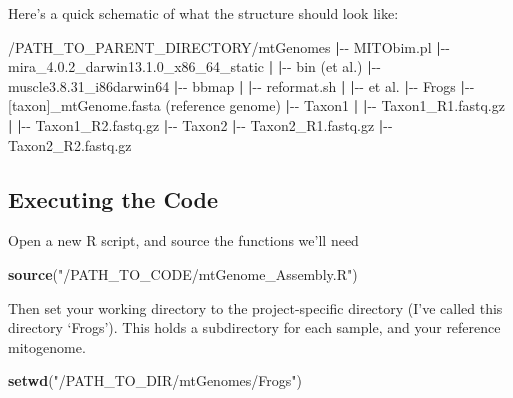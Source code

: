 \documentclass[
]{article}
\newenvironment{Shaded}{\begin{snugshade}}{\end{snugshade}}
\newcommand{\ExtensionTok}[1]{#1}
\newcommand{\KeywordTok}[1]{\textcolor[rgb]{0.13,0.29,0.53}{\textbf{#1}}}
\newcommand{\NormalTok}[1]{#1}
\newcommand{\StringTok}[1]{\textcolor[rgb]{0.31,0.60,0.02}{#1}}
\begin{document}
Here's a quick schematic of what the structure should look like:

\begin{Shaded}
\begin{Highlighting}[]
\ExtensionTok{/PATH\_TO\_PARENT\_DIRECTORY/mtGenomes}
\KeywordTok{|}\ExtensionTok{{-}{-}}\NormalTok{ MITObim.pl}
\KeywordTok{|}\ExtensionTok{{-}{-}}\NormalTok{ mira\_4.0.2\_darwin13.1.0\_x86\_64\_static}
\KeywordTok{|}   \KeywordTok{|}\ExtensionTok{{-}{-}}\NormalTok{ bin (et al.)}
\KeywordTok{|}\ExtensionTok{{-}{-}}\NormalTok{ muscle3.8.31\_i86darwin64}
\KeywordTok{|}\ExtensionTok{{-}{-}}\NormalTok{ bbmap}
\KeywordTok{|}   \KeywordTok{|}\ExtensionTok{{-}{-}}\NormalTok{ reformat.sh}
\KeywordTok{|}   \KeywordTok{|}\ExtensionTok{{-}{-}}\NormalTok{ et al.}
\KeywordTok{|}\ExtensionTok{{-}{-}}\NormalTok{ Frogs}
    \KeywordTok{|}\ExtensionTok{{-}{-}}\NormalTok{ [taxon]\_mtGenome.fasta (reference genome)}
    \KeywordTok{|}\ExtensionTok{{-}{-}}\NormalTok{ Taxon1}
    \KeywordTok{|}   \KeywordTok{|}\ExtensionTok{{-}{-}}\NormalTok{ Taxon1\_R1.fastq.gz}
    \KeywordTok{|}   \KeywordTok{|}\ExtensionTok{{-}{-}}\NormalTok{ Taxon1\_R2.fastq.gz}
    \KeywordTok{|}\ExtensionTok{{-}{-}}\NormalTok{ Taxon2}
        \KeywordTok{|}\ExtensionTok{{-}{-}}\NormalTok{ Taxon2\_R1.fastq.gz}
        \KeywordTok{|}\ExtensionTok{{-}{-}}\NormalTok{ Taxon2\_R2.fastq.gz}
\end{Highlighting}
\end{Shaded}

\pagebreak

\hypertarget{executing-the-code}{%
\subsection{Executing the Code}\label{executing-the-code}}

Open a new R script, and source the functions we'll need

\begin{Shaded}
\begin{Highlighting}[]
\KeywordTok{source}\NormalTok{(}\StringTok{"/PATH\_TO\_CODE/mtGenome\_Assembly.R"}\NormalTok{)}
\end{Highlighting}
\end{Shaded}

Then set your working directory to the project-specific directory (I've
called this directory `Frogs'). This holds a subdirectory for each
sample, and your reference mitogenome.

\begin{Shaded}
\begin{Highlighting}[]
\KeywordTok{setwd}\NormalTok{(}\StringTok{"/PATH\_TO\_DIR/mtGenomes/Frogs"}\NormalTok{)}
\end{Highlighting}
\end{Shaded}
\end{document}
